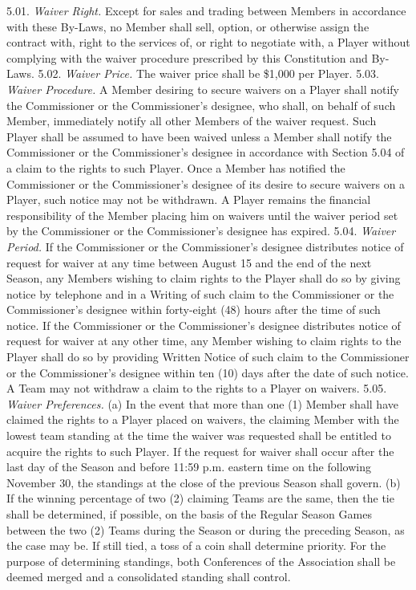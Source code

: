 \documentclass[
]{book}
\begin{document}
5.01. \emph{Waiver Right.} Except for sales and trading between Members in accordance with these By-Laws, no Member shall sell, option, or otherwise assign the contract with, right to the services of, or right to negotiate with, a Player without complying with the waiver procedure prescribed by this Constitution and By-Laws.
5.02. \emph{Waiver Price.} The waiver price shall be \$1,000 per Player.
5.03. \emph{Waiver Procedure.} A Member desiring to secure waivers on a Player shall notify the Commissioner or the Commissioner's designee, who shall, on behalf of such Member, immediately notify all other Members of the waiver request. Such Player shall be assumed to have been waived unless a Member shall notify the Commissioner or the Commissioner's designee in accordance with Section 5.04 of a claim to the rights to such Player. Once a Member has notified the Commissioner or the Commissioner's designee of its desire to secure waivers on a Player, such notice may not be withdrawn. A Player remains the financial responsibility of the Member placing him on waivers until the waiver period set by the Commissioner or the Commissioner's designee has expired.
5.04. \emph{Waiver Period.} If the Commissioner or the Commissioner's designee distributes notice of request for waiver at any time between August 15 and the end of the next Season, any Members wishing to claim rights to the Player shall do so by giving notice by telephone and in a Writing of such claim to the Commissioner or the Commissioner's designee within forty-eight (48) hours after the time of such notice. If the Commissioner or the Commissioner's designee distributes notice of request for waiver at any other time, any Member wishing to claim rights to the Player shall do so by providing Written Notice of such claim to the Commissioner or the Commissioner's designee within ten (10) days after the date of such notice. A Team may not withdraw a claim to the rights to a Player on waivers.
5.05. \emph{Waiver Preferences.}
(a) In the event that more than one (1) Member shall have claimed the rights to a Player placed on waivers, the claiming Member with the lowest team standing at the time the waiver was requested shall be entitled to acquire the rights to such Player. If the request for waiver shall occur after the last day of the Season and before 11:59 p.m. eastern time on the following November 30, the standings at the close of the previous Season shall govern.
(b) If the winning percentage of two (2) claiming Teams are the same, then the tie shall be determined, if possible, on the basis of the Regular Season Games between the two (2) Teams during the Season or during the preceding Season, as the case may be. If still tied, a toss of a coin shall determine priority. For the purpose of determining standings, both Conferences of the Association shall be deemed merged and a consolidated standing shall control.
\end{document}
